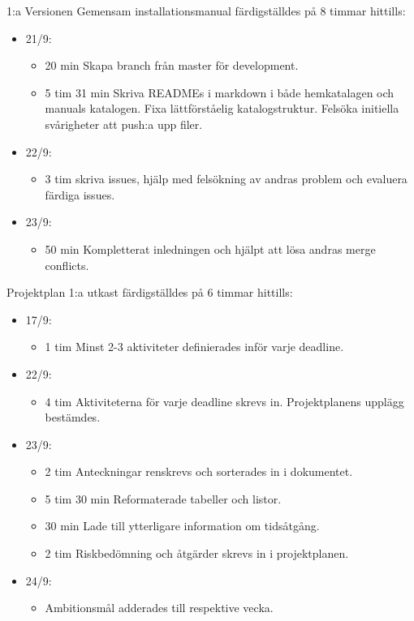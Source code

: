 \documentclass{TDP003mall}
\begin{document}
1:a Versionen Gemensam installationsmanual färdigställdes på 8 timmar hittills:
\begin{itemize}
	\item 21/9:
	\begin{itemize}
		\item 20 min Skapa branch från master för development.
		\item 5 tim 31 min Skriva READMEs i markdown i både hemkatalagen och manuals katalogen. Fixa lättförståelig katalogstruktur. Felsöka initiella svårigheter att push:a upp filer.
	\end{itemize}
	\item 22/9:
	\begin{itemize}
                \item 3 tim skriva issues, hjälp med felsökning av andras problem och evaluera färdiga issues.
        \end{itemize}
        \item 23/9:
        \begin{itemize}
                \item 50 min Kompletterat inledningen och hjälpt att lösa andras merge conflicts.\\
	\end{itemize}
\end{itemize}

	Projektplan 1:a utkast färdigställdes på 6 timmar hittills:
\begin{itemize}
	\item 17/9:
	\begin{itemize}
		\item 1 tim Minst 2-3 aktiviteter definierades inför varje deadline.
	\end{itemize}
	\item 22/9:
	\begin{itemize}
		\item 4 tim Aktiviteterna för varje deadline skrevs in. Projektplanens upplägg bestämdes.
	\end{itemize}
	\item 23/9:
	\begin{itemize}
		\item 2 tim Anteckningar renskrevs och sorterades in i dokumentet.
		\item 5 tim 30 min Reformaterade tabeller och listor.
		\item 30 min Lade till ytterligare information om tidsåtgång.
                \item 2 tim Riskbedömning och åtgärder skrevs in i projektplanen.
	\end{itemize}
        \item 24/9:
        \begin{itemize}
          \item Ambitionsmål adderades till respektive vecka.
	\end{itemize}
      \end{itemize}
\end{document}
